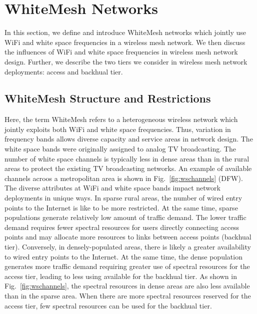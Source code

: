 \section{WhiteMesh Networks}
\label{sec:problemformulation}

In this section, we define and introduce WhiteMesh networks which jointly use WiFi and white space 
frequencies in a wireless mesh network. We then discuss the influences of WiFi and white 
space frequencies in wireless mesh network design. Further, we describe the two tiers we consider in 
wireless mesh network deployments: access and backhual tier.


\subsection{WhiteMesh Structure and Restrictions}
\label{subsec:problem}
Here, the term WhiteMesh refers to a heterogeneous wireless network which jointly exploits 
both WiFi and white space frequencies. Thus, variation in frequency bands allows diverse 
capacity and service areas in network design.
The white space bands were originally assigned to analog TV broadcasting. The 
number of white space channels is typically less in dense areas than in the rural areas to protect the 
existing TV broadcasting networks. An example of available channels acroos a metropolitan area is shown in Fig.~\ref{fig:wschannels} (DFW). 
The diverse attributes at WiFi and white space bands impact network deployments in unique ways.
In sparse rural areas, the number of wired entry points to the Internet is like to be more restricted. 
At the same time, sparse populations generate relatively low amount of traffic 
demand. The lower traffic demand requires fewer spectral resources for users directly connecting access points
and may allocate more resources to links between access points (backhual tier).
Conversely, in densely-populated areas, there is likely a greater availability to wired entry points to the Internet.
At the same time, the dense population generates more traffic demand requiring greater use of spectral resources
for the access tier, leading to less using available for the backhual tier. 
As shown in Fig.~\ref{fig:wschannels}, the spectral resources in dense areas 
are also less available than in the sparse area. 
When there are more spectral resources reserved 
for the access tier, few spectral resources can be used for the backhual tier.


